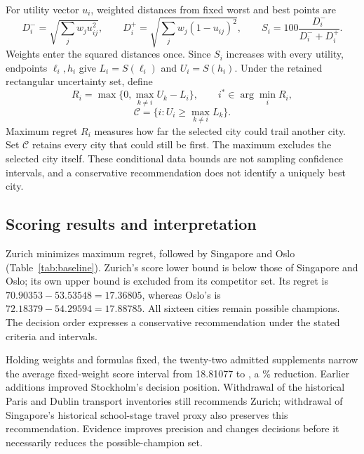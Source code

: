 For utility vector $u_i$, weighted distances from fixed worst and best points are
\begin{equation}
 D_i^-=\sqrt{\sum_jw_ju_{ij}^2},\qquad
 D_i^+=\sqrt{\sum_jw_j(1-u_{ij})^2},\qquad
 S_i=100\frac{D_i^-}{D_i^-+D_i^+}.
\end{equation}
Weights enter the squared distances once. Since $S_i$ increases with every
utility, endpoints $\ell_i,h_i$ give $L_i=S(\ell_i)$ and $U_i=S(h_i)$.
Under the retained rectangular uncertainty set, define
\begin{equation}
 R_i=\max\{0,\max_{k\ne i}U_k-L_i\},\qquad
 i^*\in\arg\min_iR_i,
 \label{eq:regret}
\end{equation}
\begin{equation}
 \mathcal C=\{i:U_i\geq\max_{k\ne i}L_k\}.
\end{equation}
Maximum regret $R_i$ measures how far the selected city could trail another
city. Set $\mathcal C$ retains every city that could still be first.
The maximum excludes the selected city itself. These conditional data bounds
are not sampling confidence intervals, and a conservative recommendation does
not identify a uniquely best city.

\subsection{Scoring results and interpretation}
Zurich minimizes maximum regret, followed by Singapore and Oslo
(Table~\ref{tab:baseline}). Zurich's score lower bound is below those of
Singapore and Oslo; its own upper bound is excluded from its competitor set.
Its regret is $70.90353-53.53548=17.36805$, whereas Oslo's is
$72.18379-54.29594=17.88785$. All sixteen cities remain possible champions.
The decision order expresses a conservative recommendation under the stated
criteria and intervals.





Holding weights and formulas fixed, the twenty-two admitted supplements narrow
the average fixed-weight score interval from 18.81077 to \CurrentMeanWidth{}, a
\TotalWidthReduction\% reduction. \LatestEvidenceChange
Earlier additions improved Stockholm's decision position. Withdrawal of the historical Paris and Dublin transport inventories still recommends Zurich; withdrawal of Singapore's historical school-stage travel proxy also preserves this recommendation. Evidence improves precision and changes decisions before it
necessarily reduces the possible-champion set.

